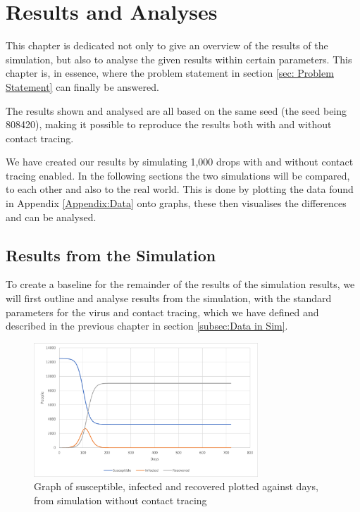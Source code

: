 \chapter{Results and Analyses} \label{chap:result}

This chapter is dedicated not only to give an overview of the results of the simulation, but also to analyse the given results within certain parameters. This chapter is, in essence, where the problem statement in section \vref{sec: Problem Statement} can finally be answered.

The results shown and analysed are all based on the same seed (the seed being 808420), making it possible to reproduce the results both with and without contact tracing. 

We have created our results by simulating 1,000 drops with and without contact tracing enabled. In the following sections the two simulations will be compared, to each other and also to the real world. This is done by plotting the data found in Appendix \ref{Appendix:Data} onto graphs, these then visualises the differences and can be analysed. 

\section{Results from the Simulation}

To create a baseline for the remainder of the results of the simulation results, we will first outline and analyse results from the simulation, with the standard parameters for the virus and contact tracing, which we have defined and described in the previous chapter in section \ref{subsec:Data in Sim}.

\begin{figure}[H]
    \centering
    \includegraphics[width=0.75\textwidth]{0_billeder/Sim_CT_OFF.png}
    \caption{Graph of susceptible, infected and recovered plotted against days, from simulation without contact tracing}
    \label{fig:Sim_CT_OFF-1}
\end{figure}

